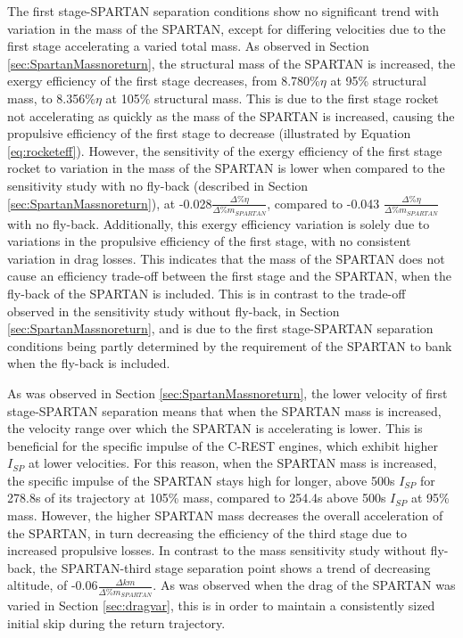 The first stage-SPARTAN separation conditions show no significant trend with variation in the mass of the SPARTAN, except for differing velocities due to the first stage accelerating a varied total mass.
As observed in Section \ref{sec:SpartanMassnoreturn}, the structural mass of the SPARTAN is increased, the exergy efficiency of the first stage decreases, from 8.780\%$\eta$ at 95\% structural mass, to 8.356\%$\eta$ at 105\% structural mass. This is due to the first stage rocket not accelerating as quickly as the mass of the SPARTAN is increased, causing the propulsive efficiency of the first stage to decrease (illustrated by Equation \ref{eq:rocketeff}).
 However, the sensitivity of the exergy efficiency of the first stage rocket to variation in the mass of the SPARTAN is lower when compared to the sensitivity study with no fly-back (described in Section \ref{sec:SpartanMassnoreturn}), at -0.028$\frac{\Delta \%\eta}{\Delta\% m_{SPARTAN}}$, compared to -0.043 $\frac{\Delta \%\eta}{\Delta\% m_{SPARTAN}}$ with no fly-back. Additionally, this exergy efficiency variation is solely due to variations in the propulsive efficiency of the first stage, with no consistent variation in drag losses. This indicates that the mass of the SPARTAN does not cause an efficiency trade-off between the first stage and the SPARTAN, when the fly-back of the SPARTAN is included. This is in contrast to the trade-off observed in the sensitivity study without fly-back, in Section \ref{sec:SpartanMassnoreturn}, and is due to the first stage-SPARTAN separation conditions being partly determined by the requirement of the SPARTAN to bank when the fly-back is included. 
 
 As was observed in Section \ref{sec:SpartanMassnoreturn}, the lower velocity of first stage-SPARTAN separation means that when the SPARTAN mass is increased, the velocity range over which the SPARTAN is accelerating is lower. This is beneficial for the specific impulse of the C-REST engines, which exhibit higher $I_{SP}$ at lower velocities. For this reason, when the SPARTAN mass is increased, the specific impulse of the SPARTAN stays high for longer, above 500s $I_{SP}$ for 278.8s of its trajectory at 105\% mass, compared to 254.4s above 500s $I_{SP}$ at 95\% mass. 
However, the higher SPARTAN mass decreases the overall acceleration of the SPARTAN, in turn decreasing the efficiency of the third stage due to increased propulsive losses.
In contrast to the mass sensitivity study without fly-back, the SPARTAN-third stage separation point shows a trend of decreasing altitude, of -0.06$\frac{\Delta km}{\Delta\% m_{SPARTAN}}$. As was observed when the drag of the SPARTAN was varied in Section \ref{sec:dragvar}, this is in order to maintain a consistently sized initial skip during the return trajectory.


